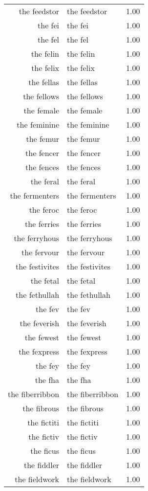 \begin{table}[ht]
\begin{tabular}{rlr}
  the feedstor & the feedstor & 1.00 \\ 
  the fei & the fei & 1.00 \\ 
  the fel & the fel & 1.00 \\ 
  the felin & the felin & 1.00 \\ 
  the felix & the felix & 1.00 \\ 
  the fellas & the fellas & 1.00 \\ 
  the fellows & the fellows & 1.00 \\ 
  the female & the female & 1.00 \\ 
  the feminine & the feminine & 1.00 \\ 
  the femur & the femur & 1.00 \\ 
  the fencer & the fencer & 1.00 \\ 
  the fences & the fences & 1.00 \\ 
  the feral & the feral & 1.00 \\ 
  the fermenters & the fermenters & 1.00 \\ 
  the feroc & the feroc & 1.00 \\ 
  the ferries & the ferries & 1.00 \\ 
  the ferryhous & the ferryhous & 1.00 \\ 
  the fervour & the fervour & 1.00 \\ 
  the festivites & the festivites & 1.00 \\ 
  the fetal & the fetal & 1.00 \\ 
  the fethullah & the fethullah & 1.00 \\ 
  the fev & the fev & 1.00 \\ 
  the feverish & the feverish & 1.00 \\ 
  the fewest & the fewest & 1.00 \\ 
  the fexpress & the fexpress & 1.00 \\ 
  the fey & the fey & 1.00 \\ 
  the fha & the fha & 1.00 \\ 
  the fiberribbon & the fiberribbon & 1.00 \\ 
  the fibrous & the fibrous & 1.00 \\ 
  the fictiti & the fictiti & 1.00 \\ 
  the fictiv & the fictiv & 1.00 \\ 
  the ficus & the ficus & 1.00 \\ 
  the fiddler & the fiddler & 1.00 \\ 
  the fieldwork & the fieldwork & 1.00 \\ 

\end{tabular}
\end{table}
